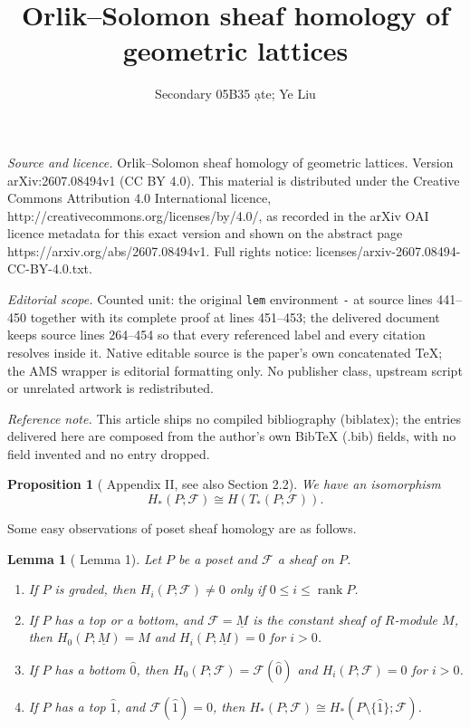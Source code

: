 \documentclass[10pt,a4paper]{amsart}
\numberwithin{equation}{section}
\newtheorem{prop}[thm]{Proposition}
\newtheorem{lem}[thm]{Lemma}
\numberwithin{equation}{section}
\newcommand{\FF}{\mathscr{F}}
\DeclareMathOperator{\rank}{rank}
\begin{document}
\title[Orlik--Solomon sheaf homology of geometric lattices]{Orlik--Solomon sheaf homology of geometric lattices}
\author{Secondary 05B35 ạte; Ye Liu}
\date{}
\maketitle
\noindent\emph{Source and licence.} Orlik--Solomon sheaf homology of geometric lattices. Version arXiv:2607.08494v1 (CC BY 4.0). This material is distributed under the Creative Commons Attribution 4.0 International licence, http://creativecommons.org/licenses/by/4.0/, as recorded in the arXiv OAI licence metadata for this exact version and shown on the abstract page https://arxiv.org/abs/2607.08494v1. Full rights notice: licenses/arxiv-2607.08494-CC-BY-4.0.txt.\par\smallskip
\noindent\textit{Editorial scope.} Counted unit: the original \texttt{lem} environment \texttt{-} at source lines 441--450 together with its complete proof at lines 451--453; the delivered document keeps source lines 264--454 so that every referenced label and every citation resolves inside it. Native editable source is the paper's own concatenated TeX; the AMS wrapper is editorial formatting only. No publisher class, upstream script or unrelated artwork is redistributed.
\par\smallskip\noindent\textit{Reference note.} This article ships no compiled bibliography (biblatex); the entries delivered here are composed from the author's own BibTeX (.bib) fields, with no field invented and no entry dropped.
\begin{prop}[\cite{Gabriel1967} Appendix II, see also \cite{Everitt2022} Section 2.2]\label{chaincomplex}
    We have an isomorphism
\[
H_*(P;\FF)\cong H(T_*(P;\FF)).
\]
\end{prop}

Some easy observations of poset sheaf homology are as follows.
\begin{lem}[\cite{Everitt2022} Lemma 1]\label{basiclemma}
    Let $P$ be a poset and $\FF$ a sheaf on $P$.
    \begin{enumerate}
        \item If $P$ is graded, then $H_i(P;\FF)\neq 0$ only if $0\leq i\leq \rank P$.
        \item If $P$ has a top or a bottom, and $\FF=\underline{M}$ is the constant sheaf of $R$-module $M$, then $H_0(P;\underline{M})=M$ and $H_i(P;\underline{M})=0$ for $i>0$.
        \item If $P$ has a bottom $\hat{0}$, then $H_0(P;\FF)=\FF(\hat{0})$ and $H_i(P;\FF)=0$ for $i>0$.
        \item If $P$ has a top $\hat{1}$, and $\FF(\hat{1})=0$, then $H_*(P;\FF)\cong H_*(P\setminus\{\hat{1}\};\FF)$.
    \end{enumerate}
\end{lem}
\end{document}
